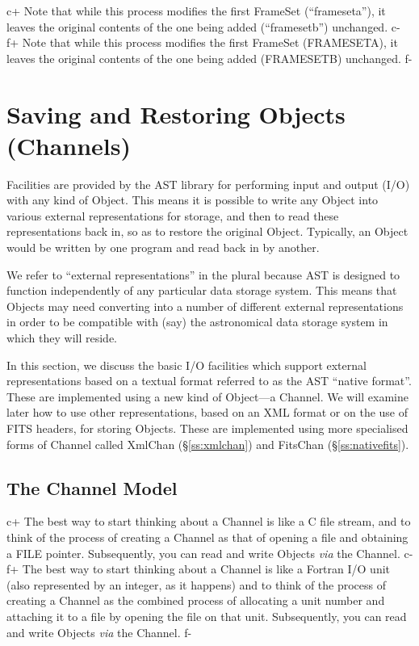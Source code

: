 \documentclass[twoside,11pt]{article}
\newcommand{\secref}[1]{\S\ref{#1}}
\newcommand{\secref}[1]{\ref{#1}}
\begin{document}
c+
Note that while this process modifies the first FrameSet
(``frameseta''), it leaves the original contents of the one being
added (``framesetb'') unchanged.
c-
f+
Note that while this process modifies the first FrameSet (FRAMESETA),
it leaves the original contents of the one being added (FRAMESETB)
unchanged.
f-


\cleardoublepage
\section{\label{ss:channels}Saving and Restoring Objects (Channels)}

Facilities are provided by the AST library for performing input and
output (I/O) with any kind of Object. This means it is possible
to write any Object into various external representations for
storage, and then to read these representations back in, so as to
restore the original Object. Typically, an Object would be written by
one program and read back in by another.

We refer to ``external representations'' in the plural because AST is
designed to function independently of any particular data storage
system. This means that Objects may need converting into a number of
different external representations in order to be compatible with
(say) the astronomical data storage system in which they will reside.

In this section, we discuss the basic I/O facilities which support
external representations based on a textual format referred to as the AST
``native format''. These are implemented using a new kind of Object---a
Channel. We will examine later how to use other representations, based on
an XML format or on the use of FITS headers, for storing Objects. These
are implemented using more specialised forms of Channel called XmlChan 
(\secref{ss:xmlchan}) and FitsChan (\secref{ss:nativefits}).

\subsection{The Channel Model}

c+
The best way to start thinking about a Channel is like a C file
stream, and to think of the process of creating a Channel as that
of opening a file and obtaining a FILE pointer.  Subsequently, you can
read and write Objects {\em{via}} the Channel.
c-
f+
The best way to start thinking about a Channel is like a Fortran I/O
unit (also represented by an integer, as it happens) and to think of
the process of creating a Channel as the combined process of
allocating a unit number and attaching it to a file by opening the
file on that unit. Subsequently, you can read and write Objects
{\em{via}} the Channel.
f-
\end{document}
